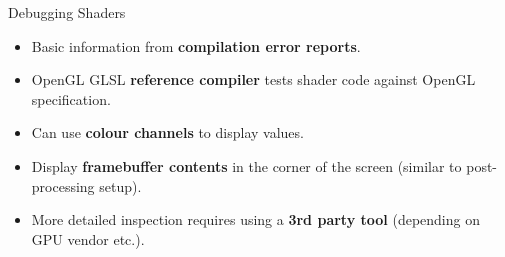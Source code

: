 \begin{frame}{Debugging Shaders}
	\begin{itemize}
		\pause\item Basic information from \textbf{compilation error reports}.
		\pause\item OpenGL GLSL \textbf{reference compiler} tests shader code against OpenGL specification.
		\pause\item Can use \textbf{colour channels} to display values.
		\pause\item Display \textbf{framebuffer contents} in the corner of the screen (similar to post-processing setup).
		\pause\item More detailed inspection requires using a \textbf{3rd party tool} (depending on GPU vendor etc.).
	\end{itemize}
\end{frame}